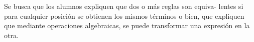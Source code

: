 \begin{parts}
    \begin{solutionbox}{6em}
        Se busca que los alumnos expliquen que dos o más reglas son equiva-
        lentes si para cualquier posición se obtienen los mismos términos o bien, que
        expliquen que mediante operaciones algebraicas, se puede transformar una
        expresión en la otra.
    \end{solutionbox}
\end{parts}
